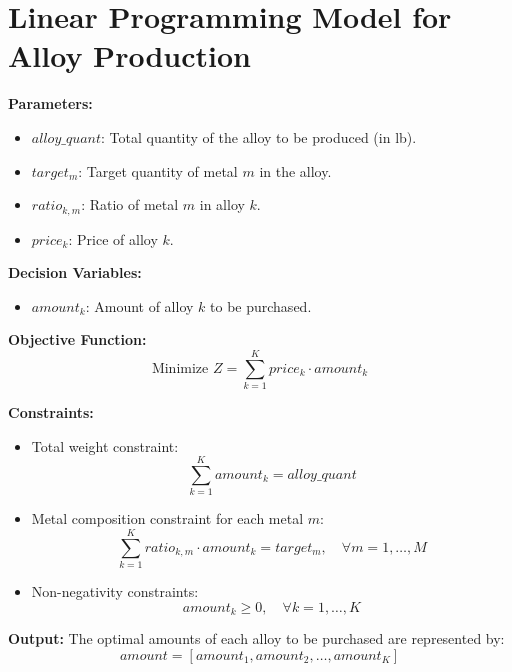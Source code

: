 \documentclass{article}
\begin{document}
\section*{Linear Programming Model for Alloy Production}

\textbf{Parameters:}
\begin{itemize}
    \item \( alloy\_quant \): Total quantity of the alloy to be produced (in lb).
    \item \( target_{m} \): Target quantity of metal \( m \) in the alloy.
    \item \( ratio_{k,m} \): Ratio of metal \( m \) in alloy \( k \).
    \item \( price_{k} \): Price of alloy \( k \).
\end{itemize}

\textbf{Decision Variables:}
\begin{itemize}
    \item \( amount_{k} \): Amount of alloy \( k \) to be purchased.
\end{itemize}

\textbf{Objective Function:}
\begin{equation}
\text{Minimize } Z = \sum_{k=1}^{K} price_{k} \cdot amount_{k}
\end{equation}

\textbf{Constraints:}
\begin{itemize}
    \item Total weight constraint:
    \begin{equation}
    \sum_{k=1}^{K} amount_{k} = alloy\_quant
    \end{equation}
    \item Metal composition constraint for each metal \( m \):
    \begin{equation}
    \sum_{k=1}^{K} ratio_{k, m} \cdot amount_{k} = target_{m}, \quad \forall m = 1, \ldots, M
    \end{equation}
    \item Non-negativity constraints:
    \begin{equation}
    amount_{k} \geq 0, \quad \forall k = 1, \ldots, K
    \end{equation}
\end{itemize}

\textbf{Output:}
The optimal amounts of each alloy to be purchased are represented by:
\begin{equation}
amount = [amount_{1}, amount_{2}, \ldots, amount_{K}]
\end{equation}
\end{document}
